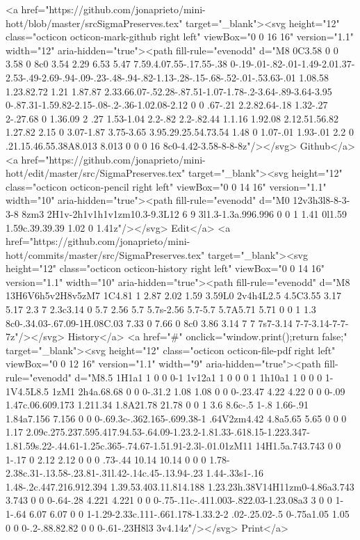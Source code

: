       <a href="https://github.com/jonaprieto/mini-hott/blob/master/srcSigmaPreserves.tex" target="_blank"><svg height="12" class="octicon octicon-mark-github right left" viewBox="0 0 16 16" version="1.1" width="12" aria-hidden="true"><path fill-rule="evenodd" d="M8 0C3.58 0 0 3.58 0 8c0 3.54 2.29 6.53 5.47 7.59.4.07.55-.17.55-.38 0-.19-.01-.82-.01-1.49-2.01.37-2.53-.49-2.69-.94-.09-.23-.48-.94-.82-1.13-.28-.15-.68-.52-.01-.53.63-.01 1.08.58 1.23.82.72 1.21 1.87.87 2.33.66.07-.52.28-.87.51-1.07-1.78-.2-3.64-.89-3.64-3.95 0-.87.31-1.59.82-2.15-.08-.2-.36-1.02.08-2.12 0 0 .67-.21 2.2.82.64-.18 1.32-.27 2-.27.68 0 1.36.09 2 .27 1.53-1.04 2.2-.82 2.2-.82.44 1.1.16 1.92.08 2.12.51.56.82 1.27.82 2.15 0 3.07-1.87 3.75-3.65 3.95.29.25.54.73.54 1.48 0 1.07-.01 1.93-.01 2.2 0 .21.15.46.55.38A8.013 8.013 0 0 0 16 8c0-4.42-3.58-8-8-8z"/></svg> Github</a>
      <a href="https://github.com/jonaprieto/mini-hott/edit/master/src/SigmaPreserves.tex" target="_blank"><svg height="12" class="octicon octicon-pencil right left" viewBox="0 0 14 16" version="1.1" width="10" aria-hidden="true"><path fill-rule="evenodd" d="M0 12v3h3l8-8-3-3-8 8zm3 2H1v-2h1v1h1v1zm10.3-9.3L12 6 9 3l1.3-1.3a.996.996 0 0 1 1.41 0l1.59 1.59c.39.39.39 1.02 0 1.41z"/></svg> Edit</a>
      <a href="https://github.com/jonaprieto/mini-hott/commits/master/src/SigmaPreserves.tex" target="_blank"><svg height="12" class="octicon octicon-history right left" viewBox="0 0 14 16" version="1.1" width="10" aria-hidden="true"><path fill-rule="evenodd" d="M8 13H6V6h5v2H8v5zM7 1C4.81 1 2.87 2.02 1.59 3.59L0 2v4h4L2.5 4.5C3.55 3.17 5.17 2.3 7 2.3c3.14 0 5.7 2.56 5.7 5.7s-2.56 5.7-5.7 5.7A5.71 5.71 0 0 1 1.3 8c0-.34.03-.67.09-1H.08C.03 7.33 0 7.66 0 8c0 3.86 3.14 7 7 7s7-3.14 7-7-3.14-7-7-7z"/></svg> History</a>
      <a  href="#" onclick="window.print();return false;" target="_blank"><svg height="12" class="octicon octicon-file-pdf right left" viewBox="0 0 12 16" version="1.1" width="9" aria-hidden="true"><path fill-rule="evenodd" d="M8.5 1H1a1 1 0 0 0-1 1v12a1 1 0 0 0 1 1h10a1 1 0 0 0 1-1V4.5L8.5 1zM1 2h4a.68.68 0 0 0-.31.2 1.08 1.08 0 0 0-.23.47 4.22 4.22 0 0 0-.09 1.47c.06.609.173 1.211.34 1.8A21.78 21.78 0 0 1 3.6 8.6c-.5 1-.8 1.66-.91 1.84a7.156 7.156 0 0 0-.69.3c-.362.165-.699.38-1 .64V2zm4.42 4.8a5.65 5.65 0 0 0 1.17 2.09c.275.237.595.417.94.53-.64.09-1.23.2-1.81.33-.618.15-1.223.347-1.81.59s.22-.44.61-1.25c.365-.74.67-1.51.91-2.3l-.01.01zM11 14H1.5a.743.743 0 0 1-.17 0 2.12 2.12 0 0 0 .73-.44 10.14 10.14 0 0 0 1.78-2.38c.31-.13.58-.23.81-.31l.42-.14c.45-.13.94-.23 1.44-.33s1-.16 1.48-.2c.447.216.912.394 1.39.53.403.11.814.188 1.23.23h.38V14H11zm0-4.86a3.743 3.743 0 0 0-.64-.28 4.221 4.221 0 0 0-.75-.11c-.411.003-.822.03-1.23.08a3 3 0 0 1-1-.64 6.07 6.07 0 0 1-1.29-2.33c.111-.661.178-1.33.2-2 .02-.25.02-.5 0-.75a1.05 1.05 0 0 0-.2-.88.82.82 0 0 0-.61-.23H8l3 3v4.14z"/></svg> Print</a>
